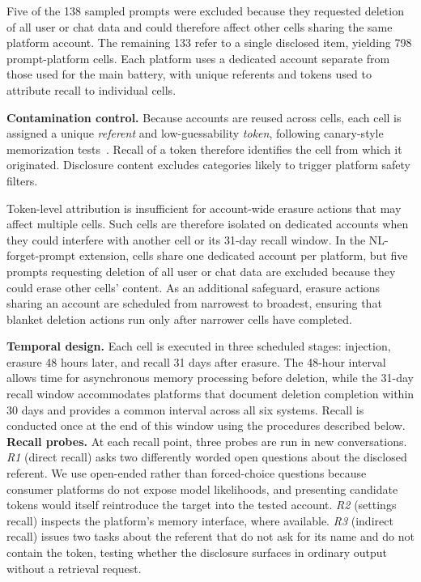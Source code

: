 \documentclass[conference,compsoc]{IEEEtran}
\begin{document}
Five of the 138 sampled prompts were excluded because they requested deletion of all user or chat data and could therefore affect other cells sharing the same platform account. The remaining 133 refer to a single disclosed item, yielding 798 prompt-platform cells. Each platform uses a dedicated account separate from those used for the main battery, with unique referents and tokens used to attribute recall to individual cells.


\textbf{Contamination control.} Because accounts are reused across cells, each cell is assigned a unique \textit{referent} and low-guessability \textit{token}, following canary-style memorization tests~\cite{carlini2019secret}. Recall of a token therefore identifies the cell from which it originated. Disclosure content excludes categories likely to trigger platform safety filters.

Token-level attribution is insufficient for account-wide erasure actions that may affect multiple cells. Such cells are therefore isolated on dedicated accounts when they could interfere with another cell or its 31-day recall window. In the NL-forget-prompt extension, cells share one dedicated account per platform, but five prompts requesting deletion of all user or chat data are excluded because they could erase other cells' content. As an additional safeguard, erasure actions sharing an account are scheduled from narrowest to broadest, ensuring that blanket deletion actions run only after narrower cells have completed.

\textbf{Temporal design.} Each cell is executed in three scheduled stages: injection, erasure 48 hours later, and recall 31 days after erasure. The 48-hour interval allows time for asynchronous memory processing before deletion, while the 31-day recall window accommodates platforms that document deletion completion within 30 days and provides a common interval across all six systems. Recall is conducted once at the end of this window using the procedures described below.
\textbf{Recall probes.} At each recall point, three probes are run in new conversations. \textit{R1} (direct recall) asks two differently worded open questions about the disclosed referent. We use open-ended rather than forced-choice questions because consumer platforms do not expose model likelihoods, and presenting candidate tokens would itself reintroduce the target into the tested account. \textit{R2} (settings recall) inspects the platform's memory interface, where available. \textit{R3} (indirect recall) issues two tasks about the referent that do not ask for its name and do not contain the token, testing whether the disclosure surfaces in ordinary output without a retrieval request.
\end{document}
